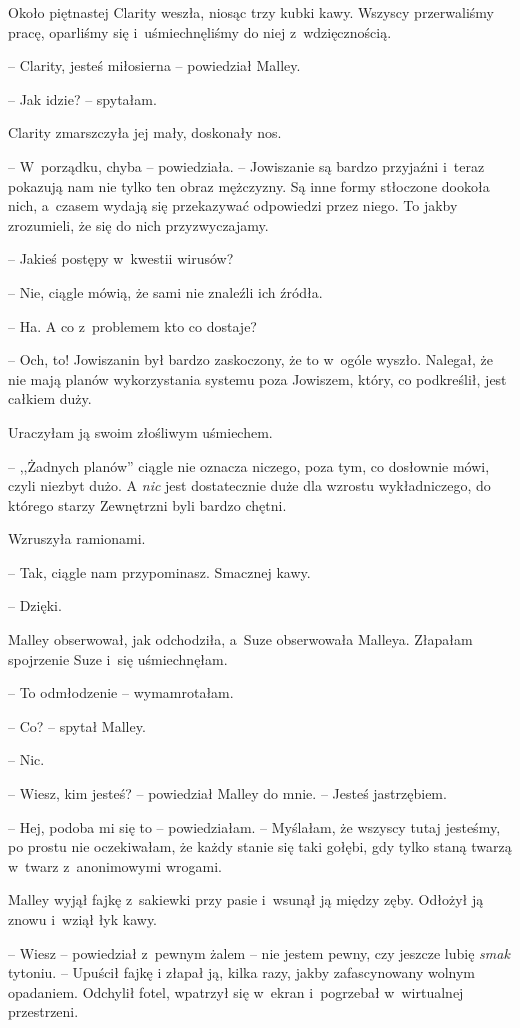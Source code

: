 \documentclass[oneside,polish,11pt,sfheadings]{mwbk}
\begin{document}
Około piętnastej Clarity weszła, niosąc trzy kubki kawy. Wszyscy przerwaliśmy
pracę, oparliśmy się i~uśmiechnęliśmy do niej z~wdzięcznością.

-- Clarity, jesteś miłosierna -- powiedział Malley.

-- Jak idzie? -- spytałam.

Clarity zmarszczyła jej mały, doskonały nos. 

-- W~porządku, chyba -- powiedziała. -- Jowiszanie są bardzo przyjaźni i~teraz pokazują nam nie
tylko ten obraz mężczyzny. Są inne formy stłoczone dookoła nich, a~czasem wydają się przekazywać odpowiedzi przez niego. To jakby
zrozumieli, że się do nich przyzwyczajamy.

-- Jakieś postępy w~kwestii wirusów?

-- Nie, ciągle mówią, że sami nie znaleźli ich źródła.

-- Ha. A co z~problemem kto co dostaje?

-- Och, to! Jowiszanin był bardzo zaskoczony, że to w~ogóle wyszło.
Nalegał, że nie mają planów wykorzystania systemu poza Jowiszem, który,
co podkreślił, jest całkiem duży.

Uraczyłam ją swoim złośliwym uśmiechem. 

-- ,,Żadnych planów'' ciągle nie
oznacza niczego, poza tym, co dosłownie mówi, czyli niezbyt dużo. A
\textit{nic} jest dostatecznie duże dla wzrostu wykładniczego, do którego
starzy Zewnętrzni byli bardzo chętni.

Wzruszyła ramionami. 

-- Tak, ciągle nam przypominasz. Smacznej kawy.

-- Dzięki.

Malley obserwował, jak odchodziła, a~Suze obserwowała Malleya. Złapałam
spojrzenie Suze i~się uśmiechnęłam.

-- To odmłodzenie -- wymamrotałam.

-- Co? -- spytał Malley.

-- Nic.

-- Wiesz, kim jesteś? -- powiedział Malley do mnie. -- Jesteś jastrzębiem.

-- Hej, podoba mi się to -- powiedziałam. -- Myślałam, że wszyscy tutaj
jesteśmy, po prostu nie oczekiwałam, że każdy stanie się taki gołębi,
gdy tylko staną twarzą w~twarz z~anonimowymi wrogami.

Malley wyjął fajkę z~sakiewki przy pasie i~wsunął ją między zęby.
Odłożył ją znowu i~wziął łyk kawy. 

-- Wiesz -- powiedział z~pewnym żalem -- nie jestem pewny, czy jeszcze lubię \textit{smak} tytoniu. -- Upuścił fajkę
i złapał ją, kilka razy, jakby zafascynowany wolnym opadaniem. Odchylił
fotel, wpatrzył się w~ekran i~pogrzebał w~wirtualnej przestrzeni.
\end{document}
